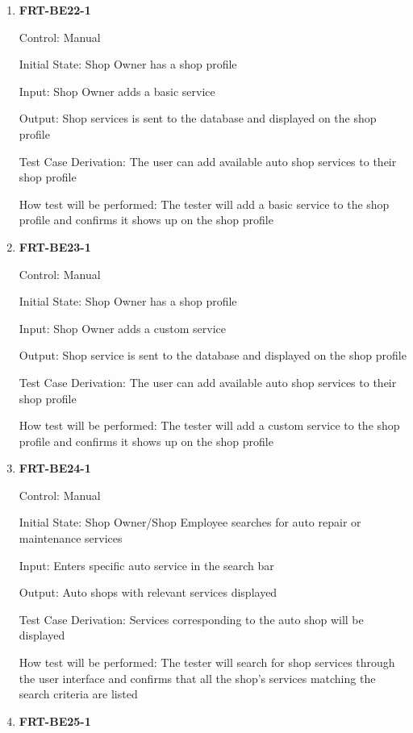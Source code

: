 \documentclass[12pt, titlepage]{article}
\begin{document}
\begin{enumerate}

	\item \textbf{FRT-BE22-1}

	      Control: Manual

	      Initial State: Shop Owner has a shop profile

	      Input: Shop Owner adds a basic service

	      Output: Shop services is sent to the database and displayed on the shop profile

	      Test Case Derivation: The user can add available auto shop services to their shop profile

	      How test will be performed: The tester will add a basic service to the shop profile and confirms it
	      shows up on the shop profile

	\item \textbf{FRT-BE23-1}

	      Control: Manual

	      Initial State: Shop Owner has a shop profile

	      Input: Shop Owner adds a custom service

	      Output: Shop service is sent to the database and displayed on the shop profile

	      Test Case Derivation: The user can add available auto shop services to their shop profile

	      How test will be performed: The tester will add a custom service to the shop profile and confirms
	      it shows up on the shop profile

	\item \textbf{FRT-BE24-1}

	      Control: Manual

	      Initial State: Shop Owner/Shop Employee searches for auto repair or maintenance services

	      Input: Enters specific auto service in the search bar

	      Output: Auto shops with relevant services displayed

	      Test Case Derivation: Services corresponding to the auto shop will be displayed

	      How test will be performed: The tester will search for shop services through the user interface and
	      confirms that all the shop's services matching the search criteria are listed

	\item \textbf{FRT-BE25-1}


\end{enumerate}
\end{document}
